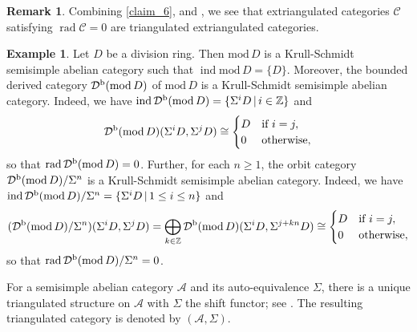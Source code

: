 \documentclass[12pt]{amsart}
\numberwithin{equation}{subsection}
\theoremstyle{plain}
\theoremstyle{definition}
\newtheorem{example}[theorem]{Example}
\newtheorem{remark}[theorem]{Remark}
\newcommand{\rad}{\operatorname{rad}}
\renewcommand{\mod}{\mathrm{mod}\,}
\newcommand{\ind}{\operatorname{ind}}
\newcommand{\Z}{\operatorname{\mathbb{Z}}\nolimits}
\newcommand{\D}{\mathcal{D}}
\newcommand{\C}{\mathcal{C}}
\begin{document}
\begin{remark}\label{remark_1}
Combining \cref{claim_6}, \cite[Theorem 2.9 and Lemma 3.2]{Iyama-Nakaoka-Palu_2024} and \cite[Theorem 3.3]{Msapato_2025}, we see that extriangulated categories $\C$ satisfying $\rad\C=0$ are triangulated extriangulated categories.
\end{remark}





\begin{example}\label{example_7}
Let $D$ be a division ring.
Then $\mod D$ is a Krull-Schmidt semisimple abelian category such that $\ind\mod D =\{D\}$. 
Moreover, the bounded derived category $\D^{\rm b}(\mod D)$ of $\mod D$ is a Krull-Schmidt semisimple abelian category.
Indeed, we have $\ind\D^{\rm b}(\mod D) =\{\Sigma^i D\,|\,i \in \Z\}$ and 
\begin{align}
    \D^{\rm b}(\mod D)(\Sigma^iD, \Sigma^jD)
    \cong
    \begin{cases}
        D & \text{if } i = j,\\
        0 & \text{otherwise},
    \end{cases}
\end{align}
so that $\rad\D^{\rm b}(\mod D)=0$.
Further, for each $n \geq 1$, the orbit category $\D^{\rm b}(\mod D)/\Sigma^n$ is a Krull-Schmidt semisimple abelian category.
Indeed, we have $\ind\D^{\rm b}(\mod D)/\Sigma^n =\{\Sigma^iD\,|\,1 \leq i \leq n\}$ and 
\begin{align}
    (\D^{\rm b}(\mod D)/\Sigma^n)(\Sigma^iD, \Sigma^jD) = \bigoplus_{k\in\Z}\D^{\rm b}(\mod D)(\Sigma^iD, \Sigma^{j+kn}D)
    \cong 
    \begin{cases}
        D & \text{if } i = j,\\
        0 & \text{otherwise},
    \end{cases}
\end{align}
so that $\rad\D^{\rm b}(\mod D)/\Sigma^n =0$.
\end{example}





For a semisimple abelian category $\mathcal{A}$ and its
auto-equivalence $\Sigma$, there is a unique triangulated structure on $\mathcal{A}$ with $\Sigma$ the shift functor; see \cite[Lemma 3.4]{X-WChen_2011}.
The resulting triangulated category is denoted by $(\mathcal{A}, \Sigma)$.
\end{document}
